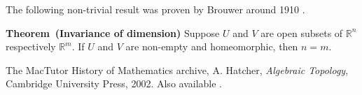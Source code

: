 \documentclass[12pt]{article}
\newcommand{\sR}[0]{\mathbb{R}}
\begin{document}
The following non-trivial result was proven by Brouwer \cite{brouwer_bib} 
around 1910 \cite{hatcher_at}.

{\bf Theorem\, (Invariance of dimension)}
 Suppose $U$ and $V$ are open subsets of $\sR^n$ respectively $\sR^m$. 
If $U$ and $V$ are non-empty and homeomorphic, then $n=m$. 

\begin{thebibliography}{9}
 The MacTutor History of Mathematics archive, 
   A. Hatcher, \emph{Algebraic Topology}, Cambridge University Press, 2002. Also available 
 .
 \end{thebibliography}
\end{document}
